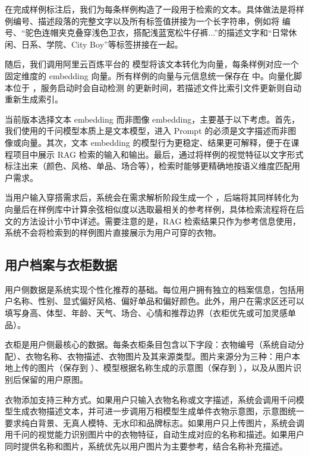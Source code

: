 \documentclass{applemlr}
\begin{document}
在完成样例标注后，我们为每条样例构造了一段用于检索的文本。具体做法是将样例编号、描述段落的完整文字以及所有标签值拼接为一个长字符串，例如将  编号、``驼色连帽夹克叠穿浅色卫衣，搭配浅蓝宽松牛仔裤...''的描述文字和``日常休闲、日系、学院、City Boy''等标签拼接在一起。

随后，我们调用阿里云百炼平台的  模型将该文本转化为向量，每条样例对应一个固定维度的 embedding 向量。所有样例的向量与元信息统一保存在  中。向量化脚本位于 ，服务启动时会自动检测  的更新时间，若描述文件比索引文件更新则自动重新生成索引。

当前版本选择文本 embedding 而非图像 embedding，主要基于以下考虑。首先，我们使用的千问模型本质上是文本模型，进入 Prompt 的必须是文字描述而非图像或向量。其次，文本 embedding 的模型行为更稳定、结果更可解释，便于在课程项目中展示 RAG 检索的输入和输出。最后，通过将样例的视觉特征以文字形式标注出来（颜色、风格、单品、场合等），检索时能够更精确地按语义维度匹配用户需求。

当用户输入穿搭需求后，系统会在需求解析阶段生成一个 ，后端将其同样转化为向量后在样例库中计算余弦相似度以选取最相关的参考样例，具体检索流程将在后文的方法设计小节中详述。需要注意的是，RAG 检索结果只作为参考信息使用，系统不会将检索到的样例图片直接展示为用户可穿的衣物。

\subsection{用户档案与衣柜数据}

用户侧数据是系统实现个性化推荐的基础。每位用户拥有独立的档案信息，包括用户名称、性别、显式偏好风格、偏好单品和偏好颜色。此外，用户在需求区还可以填写身高、体型、年龄、天气、场合、心情和推荐边界（衣柜优先或可加灵感单品）。

衣柜是用户侧最核心的数据。每条衣柜条目包含以下字段：衣物编号（系统自动分配）、衣物名称、衣物描述、衣物图片及其来源类型。图片来源分为三种：用户本地上传的图片（保存到 ）、模型根据名称生成的示意图（保存到 ），以及从图片识别后保留的用户原图。

衣物添加支持三种方式。如果用户只输入衣物名称或文字描述，系统会调用千问模型生成衣物描述文本，并可进一步调用万相模型生成单件衣物示意图，示意图统一要求纯白背景、无真人模特、无水印和品牌标志。如果用户只上传图片，系统会调用千问的视觉能力识别图片中的衣物特征，自动生成对应的名称和描述。如果用户同时提供名称和图片，系统优先以用户图片为主要参考，结合名称补充描述。
\end{document}
